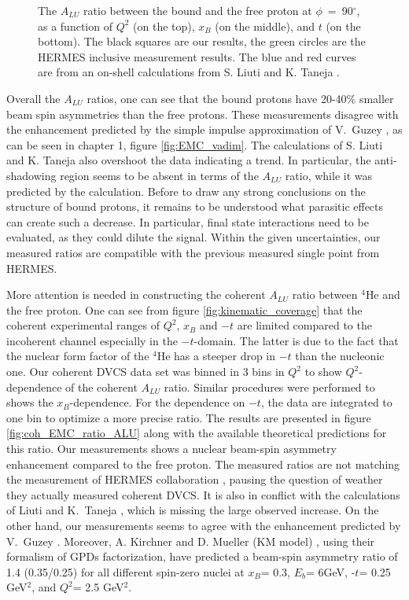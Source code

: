 \begin{figure}[tp]
\caption{ The $A_{LU}$ ratio between the bound and the free proton at 
   $\phi$~=~90$^{\circ}$, as a function of $Q^2$ (on the top), $x_B$ (on the 
   middle), and $t$ (on the bottom). The black squares are our results, the 
   green circles are the HERMES inclusive measurement \cite{HERMES_BSA} 
   results.  The blue and red curves are from an on-shell calculations from S. 
Liuti and K. Taneja \cite{simonetta_2}.} \label{fig:incoh_EMC_ratio_ALU_proton}
\end{figure}

Overall the $A_{LU}$ ratios, one can see that the bound protons 
have 20-40$\%$ smaller beam spin asymmetries than the free protons. These measurements 
disagree with the enhancement predicted by the simple impulse approximation of 
V.~Guzey \cite{EMC_vadim_2}, as can be seen in chapter 1, figure 
\ref{fig:EMC_vadim}. The calculations of S. Liuti and K. Taneja \cite{simonetta_2}
also overshoot the data indicating a trend. In particular, the 
anti-shadowing region seems to be absent in terms of the $A_{LU}$ ratio, while
it was predicted by the calculation. Before to draw any strong conclusions on the 
structure of bound protons, it remains to be understood what parasitic
effects can create such a decrease. In particular, final state interactions need
to be evaluated, as they could dilute the signal.  Within the given 
uncertainties, our measured ratios are compatible with the previous measured 
single point from HERMES.


 More attention is needed in constructing the coherent $A_{LU}$ ratio between 
 $^4$He and the free proton. One can see from figure 
 \ref{fig:kinematic_coverage} that the coherent experimental ranges of $Q^2$, 
 $x_{B}$ and $-t$ are limited compared to the incoherent channel especially in 
 the $-t$-domain. The latter is due to the fact that the nuclear form factor of 
 the $^4$He has a steeper drop in $-t$ than the nucleonic one. Our coherent 
 DVCS data set was binned in 3 bins in $Q^{2}$ to show
 $Q^{2}$-dependence of the coherent $A_{LU}$ ratio.  Similar procedures were 
 performed to shows the $x_B$-dependence. For the dependence on $-t$, the data 
 are integrated to one bin to optimize a more precise ratio. The results are 
 presented in figure \ref{fig:coh_EMC_ratio_ALU} along with the available 
 theoretical predictions for this ratio. Our measurements shows a nuclear 
 beam-spin asymmetry enhancement compared to the free proton. 
 The measured ratios are not matching the measurement of 
 HERMES collaboration \cite{HERMES_BSA}, pausing the question of weather they
 actually measured coherent DVCS. It is also in conflict with the calculations 
 of Liuti and K.~Taneja \cite{simonetta_2}, which is missing the large observed 
 increase. On the other hand, our measurements seems to agree with the 
 enhancement predicted by V.~Guzey \cite{EMC_vadim_4}.  Moreover, A.  Kirchner 
 and D. Mueller (KM model) \cite{Kir}, using their formalism of GPDs 
 factorization, have predicted a beam-spin asymmetry ratio of 1.4 (0.35/0.25) 
 for all different spin-zero nuclei at $x_{B}$= 0.3, $E_{b}$= 6GeV, -$t$= 0.25 
 GeV$^2$, and $Q^2$= 2.5 GeV$^2$.  




